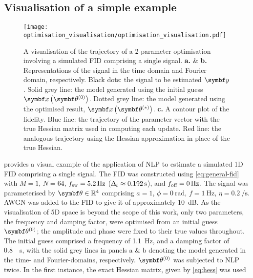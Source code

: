 \subsection{Visualisation of a simple example}
\label{subsec:optim-vis}
\begin{figure}
    \centering
    \texttt{[image: optimisation\_visualisation/optimisation\_visualisation.pdf]}
    \caption[
        A visualisation of the trajectory of a 2-parameter optimisation
        involving a simulated \acs{FID} comprising a single signal.
    ]
    {
        A visualisation of the trajectory of a 2-parameter optimisation
        involving a simulated \acs{FID} comprising a single signal.
        \textbf{a.} \& \textbf{b.} Representations of the signal in
        the time domain and Fourier domain, respectively.
        Black dots: the signal to be estimated $\by$.
        Solid grey line: the model generated
        using the initial guess $\bx \left( \bthzero \right)$.
        Dotted grey line: the model generated using the optimised result, $\bx
        \left( \bthstar \right)$.
        \textbf{c.} A contour plot of the fidelity.
        Blue line: the trajectory of the parameter vector with the true
        Hessian matrix used in computing each update.
        Red line: the analogous trajectory using the Hessian approximation
        in place of the true Hessian.
    }
    \label{fig:optim-vis}
\end{figure}
 provides a visual example of the application of \ac{NLP}
to estimate a simulated \ac{1D} \ac{FID} comprising a single signal.
The FID was constructed using \cref{eq:general-fid} with $M=1$,
$N = 64$, $f_{\mathrm{sw}} = \qty{5.2}{\hertz}$ ($\Updelta_t \approx
\qty{0.192}{\second}$), and $f_{\text{off}} = \qty{0}{\hertz}$.
The signal was parameterised by $\bth \in \mathbb{R}^4$ comprising $a=1$,
$\phi=\qty{0}{\radian}$, $f=\qty{1}{\hertz}$, $\eta=\qty{0.2}{\per\second}$.
\ac{AWGN} was added to the \ac{FID} to give it  of approximately
\qty{10}{\deci\bel}. As the visualisation of 5D space is beyond the scope of
this work, only two parameters, the frequency and damping factor, were optimised
from an initial guess $\bthzero$; the amplitude and phase were fixed to
their true values throughout. The initial guess comprised a frequency of
\qty{1.1}{\hertz}, and a damping factor of \qty{0.8}{\per\second}, with the
solid grey lines in panels a \& b denoting the model generated in the time- and
Fourier-domains, respectively. $\bthzero$ was subjected to \ac{NLP} twice. In
the first instance, the exact Hessian matrix, given by \cref{eq:hess} was used
